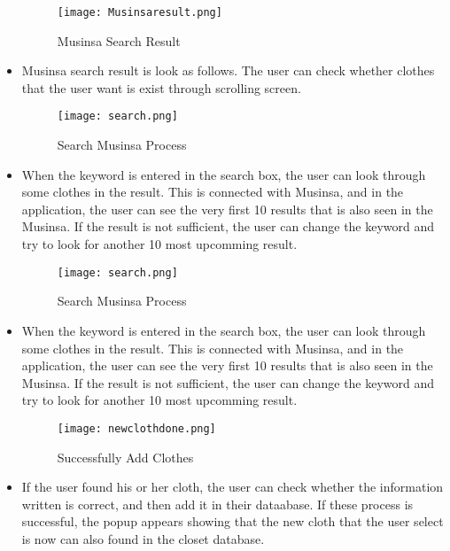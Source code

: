 \documentclass[conference]{IEEEtran}
\begin{document}
    \begin{itemize}
    \begin{figure}[htbp]
    \centerline{\texttt{[image: Musinsaresult.png]}}
    \label{fig}
    \caption{Musinsa Search Result}
    \end{figure}
    \item Musinsa search result is look as follows. The user can check whether clothes that the user want is exist through scrolling screen.\\
    
    \begin{figure}[htbp]
    \centerline{\texttt{[image: search.png]}}
    \label{fig}
    \caption{Search Musinsa Process}
    \end{figure}
    \item When the keyword is entered in the search box, the user can look through some clothes in the result. This is connected with Musinsa, and in the application, the user can see the very first 10 results that is also seen in the Musinsa. If the result is not sufficient, the user can change the keyword and try to look for another 10 most upcomming result.\\
    
        \begin{figure}[htbp]
    \centerline{\texttt{[image: search.png]}}
    \label{fig}
    \caption{Search Musinsa Process}
    \end{figure}
    \item When the keyword is entered in the search box, the user can look through some clothes in the result. This is connected with Musinsa, and in the application, the user can see the very first 10 results that is also seen in the Musinsa. If the result is not sufficient, the user can change the keyword and try to look for another 10 most upcomming result.\\
    
    \newpage
    \begin{figure}[htbp]
    \centerline{\texttt{[image: newclothdone.png]}}
    \label{fig}
    \caption{Successfully Add Clothes}
    \end{figure}
    \item If the user found his or her cloth, the user can check whether the information written is correct, and then add it in their dataabase. If these process is successful, the popup appears showing that the new cloth that the user select is now can also found in the closet database.\\
\end{itemize}
\end{document}
